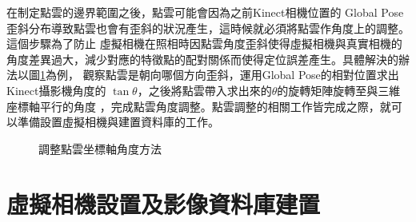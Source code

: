     在制定點雲的邊界範圍之後，點雲可能會因為之前Kinect相機位置的 Global Pose 歪斜分布導致點雲也會有歪斜的狀況產生，這時候就必須將點雲作角度上的調整。這個步驟為了防止
    虛擬相機在照相時因點雲角度歪斜使得虛擬相機與真實相機的角度差異過大，減少對應的特徵點的配對關係而使得定位誤差產生。具體解決的辦法以圖\ref{fig:rotate axis}為例，
    觀察點雲是朝向哪個方向歪斜，運用Global Pose的相對位置求出Kinect攝影機角度的 $\tan \theta$，之後將點雲帶入求出來的$\theta$的旋轉矩陣旋轉至與三維座標軸平行的角度
    ，完成點雲角度調整。點雲調整的相關工作皆完成之際，就可以準備設置虛擬相機與建置資料庫的工作。

    
    
\begin{figure}
  \begin{center}
  \end{center}
  \caption{調整點雲坐標軸角度方法 }
  \label{fig:rotate axis}
\end{figure}
    
\section{虛擬相機設置及影像資料庫建置}

